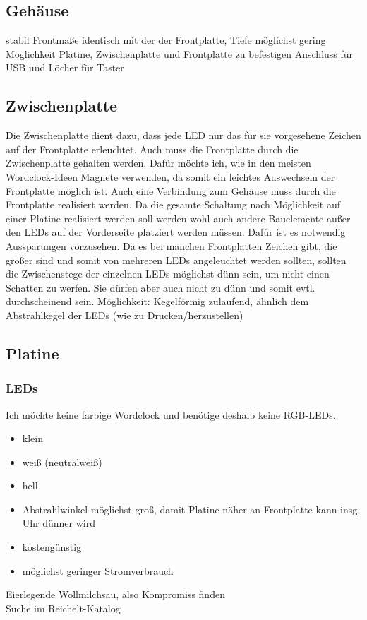 \documentclass[11pt,a4paper,ngerman]{article}
\begin{document}
\subsection{Gehäuse}
stabil
Frontmaße identisch mit der der Frontplatte, Tiefe möglichst gering 
Möglichkeit Platine, Zwischenplatte und Frontplatte zu befestigen
Anschluss für USB und Löcher für Taster
\subsection{Zwischenplatte}
Die Zwischenplatte dient dazu, dass jede LED nur das für sie vorgesehene Zeichen auf der Frontplatte erleuchtet. Auch muss die Frontplatte durch die Zwischenplatte gehalten werden. Dafür möchte ich, wie in den meisten Wordclock-Ideen Magnete verwenden, da somit ein leichtes Auswechseln der Frontplatte möglich ist. Auch eine Verbindung zum Gehäuse muss durch die Frontplatte realisiert werden. Da die gesamte Schaltung nach Möglichkeit auf einer Platine realisiert werden soll werden wohl auch andere Bauelemente außer den LEDs auf der Vorderseite platziert werden müssen. Dafür ist es notwendig Aussparungen vorzusehen.  
Da es bei manchen Frontplatten Zeichen gibt, die größer sind und somit von mehreren LEDs angeleuchtet werden sollten, sollten die Zwischenstege der einzelnen LEDs möglichst dünn sein, um nicht einen Schatten zu werfen. Sie dürfen aber auch nicht zu dünn und somit evtl. durchscheinend sein. Möglichkeit: Kegelförmig zulaufend, ähnlich dem Abstrahlkegel der LEDs (wie zu Drucken/herzustellen)
\subsection{Platine}
\subsubsection{LEDs}
Ich möchte keine farbige Wordclock und benötige deshalb keine RGB-LEDs. \\
\begin{itemize}
\item klein
\item weiß (neutralweiß) 
\item hell
\item Abstrahlwinkel möglichst groß, damit Platine näher an Frontplatte kann insg. Uhr dünner wird
\item kostengünstig
\item möglichst geringer Stromverbrauch
\end{itemize}
Eierlegende Wollmilchsau, also Kompromiss finden\\
Suche im Reichelt-Katalog
\end{document}
